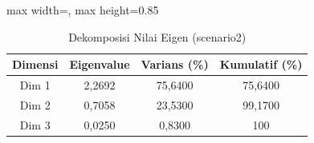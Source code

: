 \begin{table}[H]
\centering
\caption{Dekomposisi Nilai Eigen (scenario2)} \label{tab:sample2eigen}
\begin{adjustbox}{max width=\textwidth, max height=0.85\textheight}
\begin{tabular}{|c|c|c|c|}
\hline
\textbf{Dimensi} & \textbf{Eigenvalue} & \textbf{Varians (\%)} & \textbf{Kumulatif (\%)} \\
\hline
Dim 1 & 2,2692 & 75,6400 & 75,6400 \\
Dim 2 & 0,7058 & 23,5300 & 99,1700 \\
Dim 3 & 0,0250 & 0,8300 & 100 \\
\hline
\end{tabular}
\end{adjustbox}
\end{table}